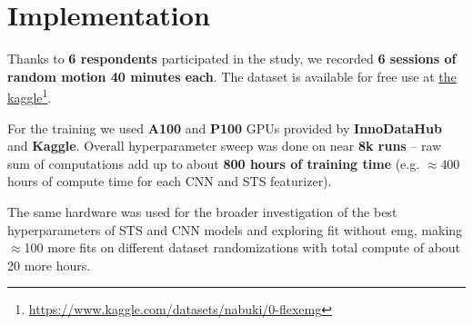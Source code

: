 \chapter{Implementation}
\label{chap:impl}

Thanks to \textbf{6 respondents} participated in the study, we recorded \textbf{6 sessions of random motion 40 minutes each}. The dataset is available for free use at \href{https://www.kaggle.com/datasets/nabuki/0-flexemg}{the kaggle}\footnote{\url{https://www.kaggle.com/datasets/nabuki/0-flexemg}}.

For the training we used \textbf{A100} and \textbf{P100} GPUs provided by \textbf{InnoDataHub} and \textbf{Kaggle}. Overall hyperparameter sweep was done on near \textbf{8k runs} -- raw sum of computations add up to about \textbf{800 hours of training time} (e.g. $\approx$400 hours of compute time for each CNN and STS featurizer).

The same hardware was used for the broader investigation of the best hyperparameters of STS and CNN models and exploring fit without emg, making $\approx$100 more fits on different dataset randomizations with total compute of about 20 more hours.